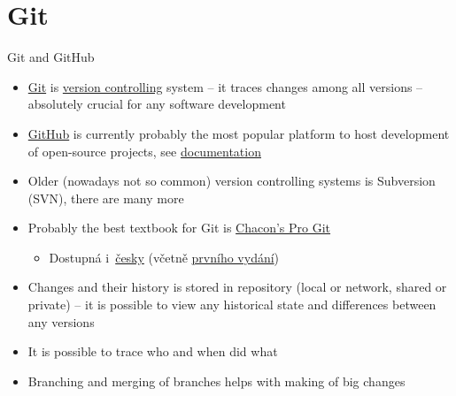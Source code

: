 \documentclass[compress, ucs, xelatex, 11pt, xcolor=svgnames,
  hyperref={
    bookmarks=true,
    unicode=true,
    colorlinks=true,
    pdftitle={Linux, command line and MetaCentrum},
    plainpages=false,
    pdfauthor={Vojtech Zeisek},
    pdfsubject={Course about use of Linux command line, writing shell scripts and using MetaCentrum of CESNET},
    pdfcreator={XeLaTeX},
    pdfkeywords={Linux, GNU, BASH, shell, command line, MetaCentrum},
    linkcolor=DarkRed,
    anchorcolor=DarkBlue,
    citecolor=Indigo,
    filecolor=NavyBlue,
    menucolor=DarkMagenta,
    urlcolor=DarkBlue,
    pdftex},
  url={hyphens, lowtilde} %
  ]{beamer}
\begin{document}
\section{Git}

\begin{frame}[fragile]{Git and GitHub}
  \begin{itemize}
    \item \href{https://git-scm.com/}{Git} is \href{https://en.wikipedia.org/wiki/Version_control}{version controlling} system -- it traces changes among all versions -- absolutely crucial for any software development
    \item \href{https://github.com/}{GitHub} is currently probably the most popular platform to host development of open-source projects, see \href{https://help.github.com/}{documentation}
    \item Older (nowadays not so common) version controlling systems is Subversion (SVN), there are many more
    \item Probably the best textbook for Git is \href{https://git-scm.com/book/en/v2}{Chacon's Pro Git}
    \begin{itemize}
      \item Dostupná i~\href{https://git-scm.com/book/cs/v2}{česky} (včetně \href{https://knihy.nic.cz/}{prvního vydání})
    \end{itemize}
    \item Changes and their history is stored in repository (local or network, shared or private) -- it is possible to view any historical state and differences between any versions
    \item It is possible to trace who and when did what
    \item Branching and merging of branches helps with making of big changes
  \end{itemize}
\end{frame}
\end{document}
